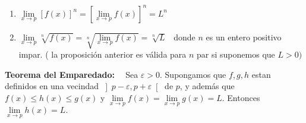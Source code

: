 \begin{enumerate}
\item $\lim\limits_{x\rightarrow p}[f(x)]^{n}=[\lim\limits_{x\rightarrow
p}f(x)]^{n}=L^{n}$

\item $\lim\limits_{x\rightarrow p}\sqrt[n]{f(x)}=\sqrt[n]{\lim
\limits_{x\rightarrow p}f(x)}=\sqrt[n]{L}$ \ donde $n$ es un entero positivo
impar. \newline( la proposici\'{o}n anterior es v\'{a}lida para $n$ par si
suponemos que $L>0)$
\end{enumerate}

\begin{theorem}
{\bf Teorema del Emparedado: \  }                           %
%
\label{a3} Sea $\varepsilon>0$. Supongamos que $f,g,h$ estan definidos en una
vecindad $\left]  p-\varepsilon,p+\varepsilon\right[  $ de $p$, y adem\'{a}s
que $f(x)\leq h(x)\leq g(x)$ y $\lim\limits_{x\rightarrow p}f(x)=\lim
\limits_{x\rightarrow p}g(x)=L.$ Entonces $\lim\limits_{x\rightarrow
p}h(x)=L.$
\end{theorem}

